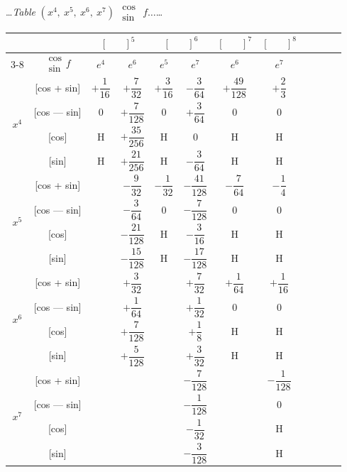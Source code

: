 \documentclass[10pt,a4paper]{article}
\newcommand{\tabletitle}[2]{%
  \begin{center}
  \ldots\textit{Table} #1 $\displaystyle\begin{smallmatrix} \cos \\ \sin \end{smallmatrix}$ #2\ldots
  \end{center}
}
\begin{document}
\newpage

\tabletitle{$(x^4,\ x^5,\ x^6,\ x^7)$}{$f\ldots$}

\begin{center}
\small
\begin{tabular}{|c|c|c|c|c|c|c|c|c|c|c|c|}
\hline
& & \multicolumn{2}{c|}{$[\phantom{()}]^5$} & \multicolumn{2}{c|}{$[\phantom{()}]^6$} & \multicolumn{1}{c|}{$[\phantom{()}]^7$} & \multicolumn{1}{c|}{$[\phantom{()}]^8$} \\
\cline{3-8}
& $\begin{smallmatrix} \cos \\ \sin \end{smallmatrix} f$ & $e^4$ & $e^6$ & $e^5$ & $e^7$ & $e^6$ & $e^7$ \\
\hline
\multirow{4}{*}{$x^4$} & [cos + sin] & $+\dfrac{1}{16}$ & $+\dfrac{7}{32}$ & $+\dfrac{3}{16}$ & $-\dfrac{3}{64}$ & $+\dfrac{49}{128}$ & $+\dfrac{2}{3}$ \\
& [cos --- sin] & $0$ & $+\dfrac{7}{128}$ & $0$ & $+\dfrac{3}{64}$ & $0$ & $0$ \\
& [cos] & H & $+\dfrac{35}{256}$ & H & $0$ & H & H \\
& [sin] & H & $+\dfrac{21}{256}$ & H & $-\dfrac{3}{64}$ & H & H \\
\hline
\multirow{4}{*}{$x^5$} & [cos + sin] & & $-\dfrac{9}{32}$ & $-\dfrac{1}{32}$ & $-\dfrac{41}{128}$ & $-\dfrac{7}{64}$ & $-\dfrac{1}{4}$ \\
& [cos --- sin] & & $-\dfrac{3}{64}$ & $0$ & $-\dfrac{7}{128}$ & $0$ & $0$ \\
& [cos] & & $-\dfrac{21}{128}$ & H & $-\dfrac{3}{16}$ & H & H \\
& [sin] & & $-\dfrac{15}{128}$ & H & $-\dfrac{17}{128}$ & H & H \\
\hline
\multirow{4}{*}{$x^6$} & [cos + sin] & & $+\dfrac{3}{32}$ & & $+\dfrac{7}{32}$ & $+\dfrac{1}{64}$ & $+\dfrac{1}{16}$ \\
& [cos --- sin] & & $+\dfrac{1}{64}$ & & $+\dfrac{1}{32}$ & $0$ & $0$ \\
& [cos] & & $+\dfrac{7}{128}$ & & $+\dfrac{1}{8}$ & H & H \\
& [sin] & & $+\dfrac{5}{128}$ & & $+\dfrac{3}{32}$ & H & H \\
\hline
\multirow{4}{*}{$x^7$} & [cos + sin] & & & & $-\dfrac{7}{128}$ & & $-\dfrac{1}{128}$ \\
& [cos --- sin] & & & & $-\dfrac{1}{128}$ & & $0$ \\
& [cos] & & & & $-\dfrac{1}{32}$ & & H \\
& [sin] & & & & $-\dfrac{3}{128}$ & & H \\
\hline
\end{tabular}
\end{center}
\end{document}
